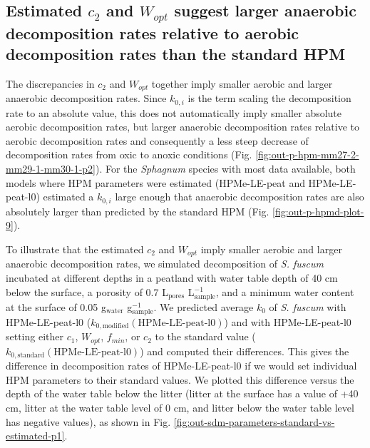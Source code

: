 \documentclass[
  12pt,
]{article}
\begin{document}
\hypertarget{out-discussion-2}{%
\subsection{\texorpdfstring{Estimated \(c_2\) and \(W_{opt}\) suggest larger anaerobic decomposition rates relative to aerobic decomposition rates than the standard HPM}{Estimated c\_2 and W\_\{opt\} suggest larger anaerobic decomposition rates relative to aerobic decomposition rates than the standard HPM}}\label{out-discussion-2}}

The discrepancies in \(c_2\) and \(W_{opt}\) together imply smaller aerobic and larger anaerobic decomposition rates. Since \(k_{0,i}\) is the term scaling the decomposition rate to an absolute value, this does not automatically imply smaller absolute aerobic decomposition rates, but larger anaerobic decomposition rates relative to aerobic decomposition rates and consequently a less steep decrease of decomposition rates from oxic to anoxic conditions (Fig. \ref{fig:out-p-hpm-mm27-2-mm29-1-mm30-1-p2}). For the \emph{Sphagnum} species with most data available, both models where HPM parameters were estimated (HPMe-LE-peat and HPMe-LE-peat-l0) estimated a \(k_{0,i}\) large enough that anaerobic decomposition rates are also absolutely larger than predicted by the standard HPM (Fig. \ref{fig:out-p-hpmd-plot-9}).

To illustrate that the estimated \(c_2\) and \(W_{opt}\) imply smaller aerobic and larger anaerobic decomposition rates, we simulated decomposition of \emph{S. fuscum} incubated at different depths in a peatland with water table depth of 40 cm below the surface, a porosity of 0.7 L\(_\text{pores}\) L\(_\text{sample}^{-1}\), and a minimum water content at the surface of 0.05 g\(_\text{water}\) g\(_\text{sample}^{-1}\). We predicted average \(k_0\) of \emph{S. fuscum} with HPMe-LE-peat-l0 (\(k_{0,\text{modified}}(\text{HPMe-LE-peat-l0})\)) and with HPMe-LE-peat-l0 setting either \(c_1\), \(W_{opt}\), \(f_{min}\), or \(c_2\) to the standard value (\(k_{0,\text{standard}}(\text{HPMe-LE-peat-l0})\)) and computed their differences. This gives the difference in decomposition rates of HPMe-LE-peat-l0 if we would set individual HPM parameters to their standard values. We plotted this difference versus the depth of the water table below the litter (litter at the surface has a value of +40 cm, litter at the water table level of 0 cm, and litter below the water table level has negative values), as shown in Fig. \ref{fig:out-sdm-parameters-standard-vs-estimated-p1}.
\end{document}
